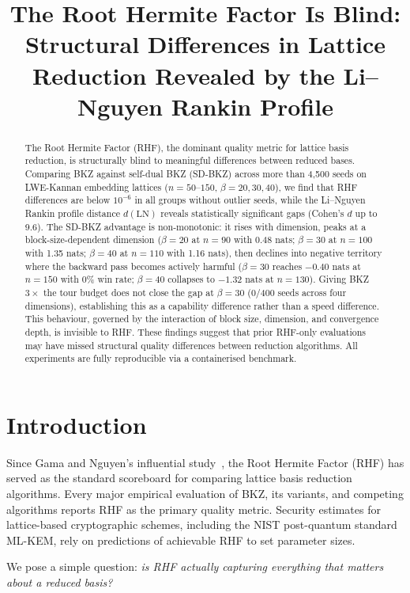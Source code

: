 \documentclass[journal=cic,version=preprint]{iacrj}
\title[running={The Root Hermite Factor Is Blind}]{The Root Hermite Factor Is Blind: Structural Differences in Lattice Reduction Revealed by the Li--Nguyen Rankin Profile}
\begin{document}
\maketitle

\begin{abstract}
The Root Hermite Factor (RHF), the dominant quality metric for lattice basis reduction, is structurally blind to meaningful differences between reduced bases. Comparing BKZ against self-dual BKZ (SD-BKZ) across more than 4{,}500 seeds on LWE-Kannan embedding lattices ($n = 50$--$150$, $\beta = 20, 30, 40$), we find that RHF differences are below $10^{-6}$ in all groups without outlier seeds, while the Li--Nguyen Rankin profile distance $d(\mathrm{LN})$ reveals statistically significant gaps (Cohen's $d$ up to 9.6). The SD-BKZ advantage is non-monotonic: it rises with dimension, peaks at a block-size-dependent dimension ($\beta=20$ at $n=90$ with 0.48 nats; $\beta=30$ at $n=100$ with 1.35 nats; $\beta=40$ at $n=110$ with 1.16 nats), then declines into negative territory where the backward pass becomes actively harmful ($\beta=30$ reaches $-0.40$ nats at $n=150$ with 0\% win rate; $\beta=40$ collapses to $-1.32$ nats at $n=130$). Giving BKZ $3\times$ the tour budget does not close the gap at $\beta=30$ (0/400 seeds across four dimensions), establishing this as a capability difference rather than a speed difference. This behaviour, governed by the interaction of block size, dimension, and convergence depth, is invisible to RHF. These findings suggest that prior RHF-only evaluations may have missed structural quality differences between reduction algorithms. All experiments are fully reproducible via a containerised benchmark.
\end{abstract}

\section{Introduction}
\label{sec:intro}

Since Gama and Nguyen's influential study~\cite{EC:GamNgu08}, the Root Hermite Factor (RHF) has served as the standard scoreboard for comparing lattice basis reduction algorithms. Every major empirical evaluation of BKZ, its variants, and competing algorithms reports RHF as the primary quality metric. Security estimates for lattice-based cryptographic schemes, including the NIST post-quantum standard ML-KEM, rely on predictions of achievable RHF to set parameter sizes.

We pose a simple question: \emph{is RHF actually capturing everything that matters about a reduced basis?}
\end{document}
